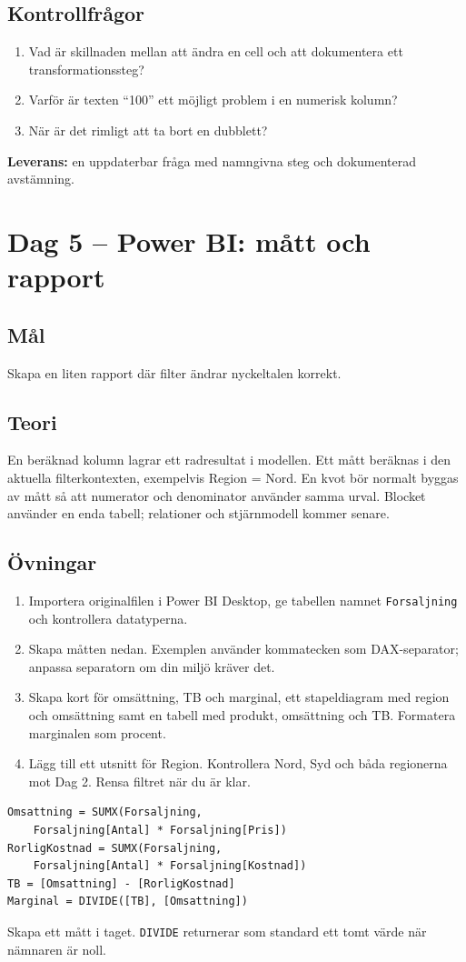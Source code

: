 \documentclass[11pt,a4paper]{article}
\newcommand{\dag}[2]{\clearpage\section{Dag #1 -- #2}}
\begin{document}
\subsection*{Kontrollfrågor}
\begin{enumerate}
\item Vad är skillnaden mellan att ändra en cell och att dokumentera ett transformationssteg?
\item Varför är texten ``100'' ett möjligt problem i en numerisk kolumn?
\item När är det rimligt att ta bort en dubblett?
\end{enumerate}
\textbf{Leverans:} en uppdaterbar fråga med namngivna steg och dokumenterad avstämning.

\dag{5}{Power BI: mått och rapport}
\subsection*{Mål}
Skapa en liten rapport där filter ändrar nyckeltalen korrekt.
\subsection*{Teori}
En beräknad kolumn lagrar ett radresultat i modellen. Ett mått beräknas i den aktuella filterkontexten, exempelvis Region = Nord. En kvot bör normalt byggas av mått så att numerator och denominator använder samma urval. Blocket använder en enda tabell; relationer och stjärnmodell kommer senare.
\subsection*{Övningar}
\begin{enumerate}
\item Importera originalfilen i Power BI Desktop, ge tabellen namnet \texttt{Forsaljning} och kontrollera datatyperna.
\item Skapa måtten nedan. Exemplen använder kommatecken som DAX-separator; anpassa separatorn om din miljö kräver det.
\item Skapa kort för omsättning, TB och marginal, ett stapeldiagram med region och omsättning samt en tabell med produkt, omsättning och TB. Formatera marginalen som procent.
\item Lägg till ett utsnitt för Region. Kontrollera Nord, Syd och båda regionerna mot Dag 2. Rensa filtret när du är klar.
\end{enumerate}
\begin{lstlisting}
Omsattning = SUMX(Forsaljning,
    Forsaljning[Antal] * Forsaljning[Pris])
RorligKostnad = SUMX(Forsaljning,
    Forsaljning[Antal] * Forsaljning[Kostnad])
TB = [Omsattning] - [RorligKostnad]
Marginal = DIVIDE([TB], [Omsattning])
\end{lstlisting}
Skapa ett mått i taget. \texttt{DIVIDE} returnerar som standard ett tomt värde när nämnaren är noll.
\end{document}
